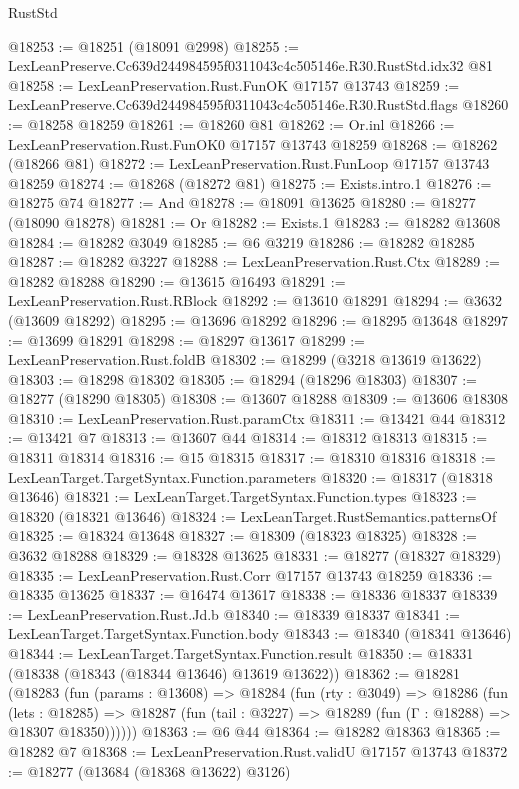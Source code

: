 \begin{lexlean}{RustStd}
\begin{coremodule}
@18253 := @18251 (@18091 @2998)
@18255 := LexLeanPreserve.Cc639d244984595f0311043c4c505146e.R30.RustStd.idx32 @81
@18258 := LexLeanPreservation.Rust.FunOK @17157 @13743
@18259 := LexLeanPreserve.Cc639d244984595f0311043c4c505146e.R30.RustStd.flags
@18260 := @18258 @18259
@18261 := @18260 @81
@18262 := Or.inl
@18266 := LexLeanPreservation.Rust.FunOK0 @17157 @13743 @18259
@18268 := @18262 (@18266 @81)
@18272 := LexLeanPreservation.Rust.FunLoop @17157 @13743 @18259
@18274 := @18268 (@18272 @81)
@18275 := Exists.intro.{1}
@18276 := @18275 @74
@18277 := And
@18278 := @18091 @13625
@18280 := @18277 (@18090 @18278)
@18281 := Or
@18282 := Exists.{1}
@18283 := @18282 @13608
@18284 := @18282 @3049
@18285 := @6 @3219
@18286 := @18282 @18285
@18287 := @18282 @3227
@18288 := LexLeanPreservation.Rust.Ctx
@18289 := @18282 @18288
@18290 := @13615 @16493
@18291 := LexLeanPreservation.Rust.RBlock
@18292 := @13610 @18291
@18294 := @3632 (@13609 @18292)
@18295 := @13696 @18292
@18296 := @18295 @13648
@18297 := @13699 @18291
@18298 := @18297 @13617
@18299 := LexLeanPreservation.Rust.foldB
@18302 := @18299 (@3218 @13619 @13622)
@18303 := @18298 @18302
@18305 := @18294 (@18296 @18303)
@18307 := @18277 (@18290 @18305)
@18308 := @13607 @18288
@18309 := @13606 @18308
@18310 := LexLeanPreservation.Rust.paramCtx
@18311 := @13421 @44
@18312 := @13421 @7
@18313 := @13607 @44
@18314 := @18312 @18313
@18315 := @18311 @18314
@18316 := @15 @18315
@18317 := @18310 @18316
@18318 := LexLeanTarget.TargetSyntax.Function.parameters
@18320 := @18317 (@18318 @13646)
@18321 := LexLeanTarget.TargetSyntax.Function.types
@18323 := @18320 (@18321 @13646)
@18324 := LexLeanTarget.RustSemantics.patternsOf
@18325 := @18324 @13648
@18327 := @18309 (@18323 @18325)
@18328 := @3632 @18288
@18329 := @18328 @13625
@18331 := @18277 (@18327 @18329)
@18335 := LexLeanPreservation.Rust.Corr @17157 @13743 @18259
@18336 := @18335 @13625
@18337 := @16474 @13617
@18338 := @18336 @18337
@18339 := LexLeanPreservation.Rust.Jd.b
@18340 := @18339 @18337
@18341 := LexLeanTarget.TargetSyntax.Function.body
@18343 := @18340 (@18341 @13646)
@18344 := LexLeanTarget.TargetSyntax.Function.result
@18350 := @18331 (@18338 (@18343 (@18344 @13646) @13619 @13622))
@18362 := @18281
    (@18283
      (fun (params : @13608) =>
      @18284
        (fun (rty : @3049) =>
        @18286
          (fun (lets : @18285) =>
          @18287 (fun (tail : @3227) => @18289 (fun (Γ : @18288) => @18307 @18350))))))
@18363 := @6 @44
@18364 := @18282 @18363
@18365 := @18282 @7
@18368 := LexLeanPreservation.Rust.validU @17157 @13743
@18372 := @18277 (@13684 (@18368 @13622) @3126)

\end{coremodule}
\end{lexlean}
